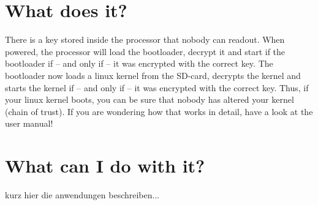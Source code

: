 \section*{What does it?}

There is a key stored inside the processor that nobody can readout. When
powered, the processor will load the bootloader, decrypt it and start if the
bootloader if -- and only if -- it was encrypted with the correct key.  The
bootloader now loads a linux kernel from the SD-card, decrypts the kernel and
starts the kernel if -- and only if -- it was encrypted with the correct key.
Thus, if your linux kernel boots, you can be sure that nobody has altered your
kernel (chain of trust). If you are wondering how that works in detail, have a
look at the user manual!

\section*{What can I do with it?}

kurz hier die anwendungen beschreiben...


